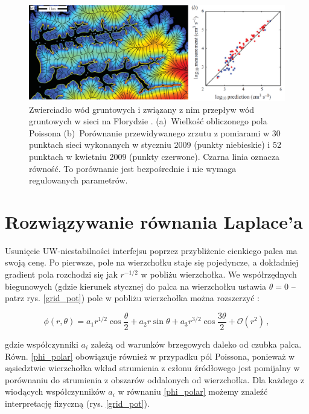 \documentclass[]{pracamgr}
\begin{document}
    \begin{figure}[H]
      \centering
      \includegraphics[width=\textwidth]{figs/potencjal_floryda_przewidywania.png}
      \caption{Zwierciadło wód gruntowych i związany z nim przepływ wód gruntowych w sieci na Florydzie \cite{petroff2011geometry}. (a)~Wielkość obliczonego pola Poissona (b)~Porównanie przewidywanego zrzutu z pomiarami w 30 punktach sieci wykonanych w styczniu 2009 (punkty niebieskie) i 52 punktach w kwietniu 2009 (punkty czerwone). Czarna linia oznacza równość. To porównanie jest bezpośrednie i nie wymaga regulowanych parametrów.}
      \label{potencjal_floryda}
    \end{figure}



  \chapter{Rozwiązywanie równania Laplace'a}\label{chapter:solving}
    
    Usunięcie UW-niestabilności interfejsu poprzez przybliżenie cienkiego palca ma swoją cenę. Po pierwsze, pole na wierzchołku staje się pojedyncze, a dokładniej gradient pola rozchodzi się jak $r^{-1/2}$ w pobliżu wierzchołka. We współrzędnych biegunowych (gdzie kierunek stycznej do palca na wierzchołku ustawia $\theta = 0$ -- patrz rys. \ref{grid_pot}) pole w pobliżu wierzchołka można rozszerzyć \cite{derrida1992needle , petroff2013bifurcation}:
    
    \begin{equation}\label{phi_polar}
      \phi(r,\theta)=a_1r^{1/2}\cos\frac{\theta}{2}+a_2r \sin \theta+a_3 r^{3/2} \cos\frac{3\theta}{2}+\mathcal{O}\left(r^2\right) \,,
    \end{equation}

    gdzie współczynniki $a_i$ zależą od warunków brzegowych daleko od czubka palca. Równ. \eqref{phi_polar} obowiązuje również w przypadku pól Poissona, ponieważ w sąsiedztwie wierzchołka wkład strumienia z członu źródłowego jest pomijalny w porównaniu do strumienia z obszarów oddalonych od wierzchołka. Dla każdego z wiodących współczynników $a_i$ w równaniu \eqref{phi_polar} możemy znaleźć interpretację fizyczną (rys. \ref{grid_pot}).
\end{document}
